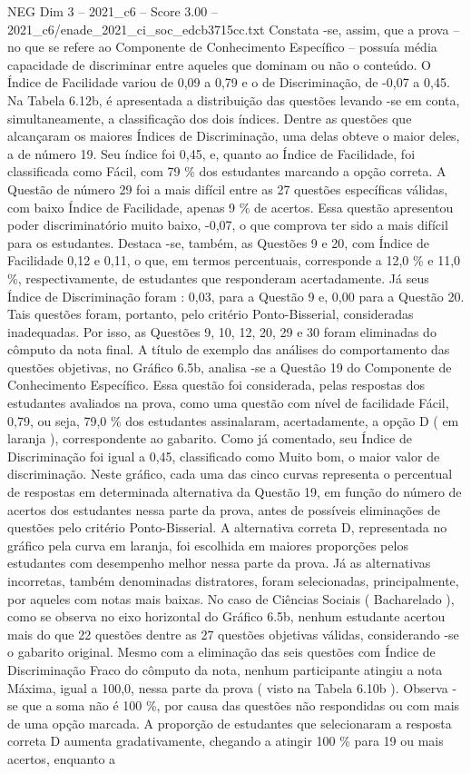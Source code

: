 \begin{textsample}{NEG Dim 3 – 2021\_c6 – Score 3.00 – 2021\_c6/enade\_2021\_ci\_soc\_edcb3715cc.txt}
Constata -se, assim, que a prova – no que se refere ao Componente de Conhecimento Específico – possuía média capacidade de discriminar entre aqueles que dominam ou não o conteúdo.
O Índice de Facilidade variou de 0,09 a 0,79 e o de Discriminação, de -0,07 a 0,45.
Na Tabela 6.12b, é apresentada a distribuição das questões levando -se em conta, simultaneamente, a classificação dos dois índices.
Dentre as questões que alcançaram os maiores Índices de Discriminação, uma delas obteve o maior deles, a de número 19.
Seu índice foi 0,45, e, quanto ao Índice de Facilidade, foi classificada como Fácil, com 79 \% dos estudantes marcando a opção correta.
A Questão de número 29 foi a mais difícil entre as 27 questões específicas válidas, com baixo Índice de Facilidade, apenas 9 \% de acertos.
Essa questão apresentou poder discriminatório muito baixo, -0,07, o que comprova ter sido a mais difícil para os estudantes.
Destaca -se, também, as Questões 9 e 20, com Índice de Facilidade 0,12 e 0,11, o que, em termos percentuais, corresponde a 12,0 \% e 11,0 \%, respectivamente, de estudantes que responderam acertadamente.
Já seus Índice de Discriminação foram : 0,03, para a Questão 9 e, 0,00 para a Questão 20.
Tais questões foram, portanto, pelo critério Ponto-Bisserial, consideradas inadequadas.
Por isso, as Questões 9, 10, 12, 20, 29 e 30 foram eliminadas do cômputo da nota final.
A título de exemplo das análises do comportamento das questões objetivas, no Gráfico 6.5b, analisa -se a Questão 19 do Componente de Conhecimento Específico.
Essa questão foi considerada, pelas respostas dos estudantes avaliados na prova, como uma questão com nível de facilidade Fácil, 0,79, ou seja, 79,0 \% dos estudantes assinalaram, acertadamente, a opção D ( em laranja ), correspondente ao gabarito.
Como já comentado, seu Índice de Discriminação foi igual a 0,45, classificado como Muito bom, o maior valor de discriminação.
Neste gráfico, cada uma das cinco curvas representa o percentual de respostas em determinada alternativa da Questão 19, em função do número de acertos dos estudantes nessa parte da prova, antes de possíveis eliminações de questões pelo critério Ponto-Bisserial.
A alternativa correta D, representada no gráfico pela curva em laranja, foi escolhida em maiores proporções pelos estudantes com desempenho melhor nessa parte da prova.
Já as alternativas incorretas, também denominadas distratores, foram selecionadas, principalmente, por aqueles com notas mais baixas.
No caso de Ciências Sociais ( Bacharelado ), como se observa no eixo horizontal do Gráfico 6.5b, nenhum estudante acertou mais do que 22 questões dentre as 27 questões objetivas válidas, considerando -se o gabarito original.
Mesmo com a eliminação das seis questões com Índice de Discriminação Fraco do cômputo da nota, nenhum participante atingiu a nota Máxima, igual a 100,0, nessa parte da prova ( visto na Tabela 6.10b ).
Observa -se que a soma não é 100 \%, por causa das questões não respondidas ou com mais de uma opção marcada.
A proporção de estudantes que selecionaram a resposta correta D aumenta gradativamente, chegando a atingir 100 \% para 19 ou mais acertos, enquanto a

\end{textsample}
